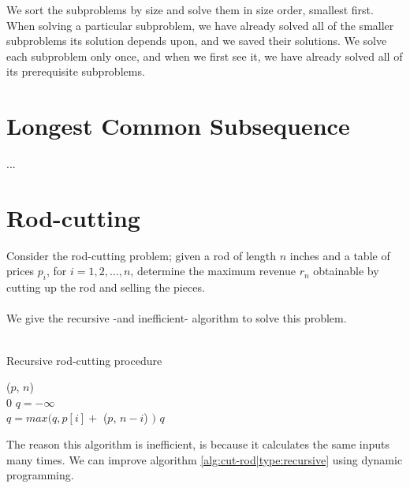 We sort the subproblems by size and solve them in size order, smallest first.
When solving a particular subproblem, we have already solved all of the
smaller subproblems its solution depends upon, and we saved their solutions.
We solve each subproblem only once, and when we first see it, we have already
solved all of its prerequisite subproblems.

\newpage
\section{Longest Common Subsequence}
...

\section{Rod-cutting}
Consider the rod-cutting problem; given a rod of length $n$ inches and a table
of prices $p_i$, for $i = 1, 2, \dots, n$, determine the maximum revenue $r_n$
obtainable by cutting up the rod and selling the pieces.
\\\\
We give the recursive -and inefficient- algorithm to solve this problem. \\\\
\begin{algorithm}[H]
	\caption{Recursive rod-cutting procedure}
	\label{alg:cut-rod|type:recursive}
	
	
	
	
	\BlankLine
	\CutRod($p$, $n$) \\
	\Begin
	{
		{
			\Return $0$
		}
		$q = -\infty$ \\
		{
			$q = max(q, p[i] + $ \CutRod($p$, $n-i$) $)$
		}
		\Return $q$
	}
\end{algorithm}
The reason this algorithm is inefficient, is because it calculates the same
inputs many times. We can improve algorithm \ref{alg:cut-rod|type:recursive}
using dynamic programming.

\newpage
